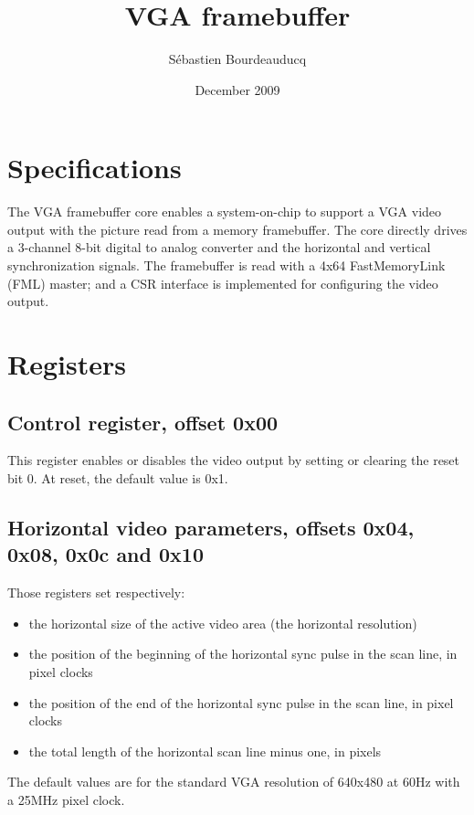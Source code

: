 \documentclass[a4paper,11pt]{article}
\title{VGA framebuffer}
\author{S\'ebastien Bourdeauducq}
\date{December 2009}
\begin{document}
\setlength{\parindent}{0pt}
\setlength{\parskip}{5pt}
\maketitle{}
\section{Specifications}
The VGA framebuffer core enables a system-on-chip to support a VGA video output with the picture read from a memory framebuffer.
The core directly drives a 3-channel 8-bit digital to analog converter and the horizontal and vertical synchronization signals.
The framebuffer is read with a 4x64 FastMemoryLink (FML) master; and a CSR interface is implemented for configuring the video output.

\section{Registers}
\subsection{Control register, offset 0x00}
This register enables or disables the video output by setting or clearing the reset bit 0. At reset, the default value is 0x1.

\subsection{Horizontal video parameters, offsets 0x04, 0x08, 0x0c and 0x10}
Those registers set respectively:
\begin{itemize}
\item the horizontal size of the active video area (the horizontal resolution)
\item the position of the beginning of the horizontal sync pulse in the scan line, in pixel clocks
\item the position of the end of the horizontal sync pulse in the scan line, in pixel clocks
\item the total length of the horizontal scan line minus one, in pixels
\end{itemize}
The default values are for the standard VGA resolution of 640x480 at 60Hz with a 25MHz pixel clock.
\end{document}
